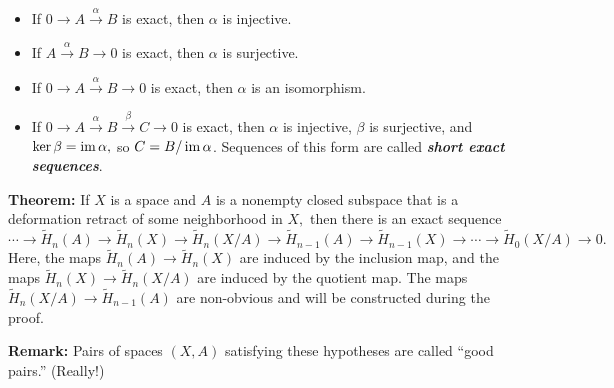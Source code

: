 \documentclass{article}
\begin{document}
\begin{itemize}[noitemsep,topsep=\mdcompacttopsep]%

\item{}If $0 \longrightarrow A \overset{\alpha}{\longrightarrow} B$ is exact, then $\alpha$ is injective.%

\item{}If $A \overset{\alpha}{\longrightarrow} B \longrightarrow 0$ is exact, then $\alpha$ is surjective.%

\item{}If $0 \longrightarrow A \overset{\alpha}{\longrightarrow} B \longrightarrow 0$ is exact, then $\alpha$ is an isomorphism.%

\item{}If $0 \longrightarrow A \overset{\alpha}{\longrightarrow} B \overset{\beta}{\longrightarrow} C \longrightarrow 0$ is exact, then $\alpha$ is injective, $\beta$ is surjective, and $\ker\beta = \operatorname{im}\alpha,$ so $C = B/\operatorname{im}\alpha$. Sequences of this form are called \textbf{\emph{short exact sequences}}.%
\end{itemize}%

\noindent{}\textbf{Theorem:} If $X$ is a space and $A$ is a nonempty closed subspace that is a deformation retract of some neighborhood in $X,$ then there is an exact sequence%
\noindent\noindent\[%
\cdots \to \widetilde{H}_n(A)
\to \widetilde{H}_n(X)
\to \widetilde{H}_n(X/A)
\to \widetilde{H}_{n-1}(A)
\to \widetilde{H}_{n-1}(X)
\to \cdots
\to \widetilde{H}_0(X/A)
\to 0.
\]%
\noindent{}Here, the maps $\widetilde{H}_n(A) \to \widetilde{H}_n(X)$ are induced by the inclusion map, and the maps $\widetilde{H}_n(X) \to \widetilde{H}_n(X/A)$ are induced by the quotient map. The maps $\widetilde{H}_n(X/A) \to \widetilde{H}_{n-1}(A)$ are non-obvious and will be constructed during the proof.

\textbf{Remark:} Pairs of spaces $(X,A)$ satisfying these hypotheses are called \textquotedblleft{}good pairs.\textquotedblright{} (Really!)%
\end{document}
